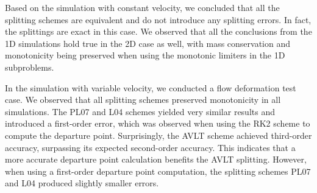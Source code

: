Based on the simulation with constant velocity, we concluded that all the splitting schemes
are equivalent and do not introduce any splitting errors. In fact, the splittings are exact in this case.
We observed that all the conclusions from the 1D simulations hold true in the 2D case as well,
with mass conservation and monotonicity being preserved when using the monotonic limiters in the 1D subproblems.

In the simulation with variable velocity, we conducted a flow deformation test case.
We observed that all splitting schemes preserved monotonicity in all simulations.
The PL07 and L04 schemes yielded very similar results and introduced a first-order error,
which was observed when using the RK2 scheme to compute the departure point.
Surprisingly, the AVLT scheme achieved third-order accuracy, surpassing its expected second-order accuracy.
This indicates that a more accurate departure point calculation benefits the AVLT splitting.
However, when using a first-order departure point computation, the splitting schemes PL07 and L04 produced slightly smaller errors.
